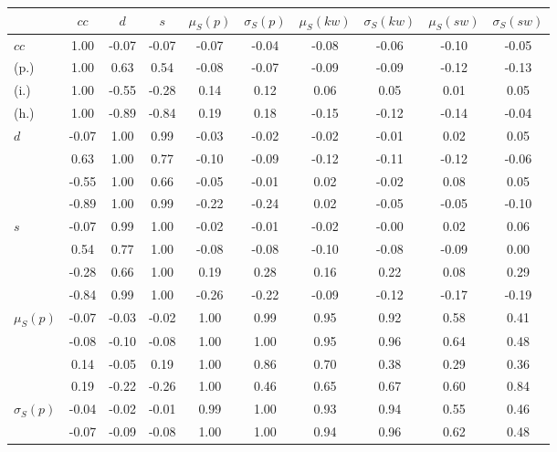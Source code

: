 \begin{table*}[h!]
\begin{center}
\begin{tabular}{| l | c | c | c | c | c | c | c | c | c |}\hline
 & $cc$ & $d$ & $s$ & $\mu_S(p)$ & $\sigma_S(p)$ & $\mu_S(kw)$ & $\sigma_S(kw)$ & $\mu_S(sw)$ & $\sigma_S(sw)$ \\\hline
$cc$ & 1.00  & -0.07  & -0.07  & -0.07  & -0.04  & -0.08  & -0.06  & -0.10  & -0.05 \\\hline
(p.) & 1.00  & 0.63  & 0.54  & -0.08  & -0.07  & -0.09  & -0.09  & -0.12  & -0.13 \\\hline
(i.) & 1.00  & -0.55  & -0.28  & 0.14  & 0.12  & 0.06  & 0.05  & 0.01  & 0.05 \\\hline
(h.) & 1.00  & -0.89  & -0.84  & 0.19  & 0.18  & -0.15  & -0.12  & -0.14  & -0.04 \\\hline
$d$ & -0.07  & 1.00  & 0.99  & -0.03  & -0.02  & -0.02  & -0.01  & 0.02  & 0.05 \\\hline
 & 0.63  & 1.00  & 0.77  & -0.10  & -0.09  & -0.12  & -0.11  & -0.12  & -0.06 \\\hline
 & -0.55  & 1.00  & 0.66  & -0.05  & -0.01  & 0.02  & -0.02  & 0.08  & 0.05 \\\hline
 & -0.89  & 1.00  & 0.99  & -0.22  & -0.24  & 0.02  & -0.05  & -0.05  & -0.10 \\\hline
$s$ & -0.07  & 0.99  & 1.00  & -0.02  & -0.01  & -0.02  & -0.00  & 0.02  & 0.06 \\\hline
 & 0.54  & 0.77  & 1.00  & -0.08  & -0.08  & -0.10  & -0.08  & -0.09  & 0.00 \\\hline
 & -0.28  & 0.66  & 1.00  & 0.19  & 0.28  & 0.16  & 0.22  & 0.08  & 0.29 \\\hline
 & -0.84  & 0.99  & 1.00  & -0.26  & -0.22  & -0.09  & -0.12  & -0.17  & -0.19 \\\hline
$\mu_S(p)$ & -0.07  & -0.03  & -0.02  & 1.00  & 0.99  & 0.95  & 0.92  & 0.58  & 0.41 \\\hline
 & -0.08  & -0.10  & -0.08  & 1.00  & 1.00  & 0.95  & 0.96  & 0.64  & 0.48 \\\hline
 & 0.14  & -0.05  & 0.19  & 1.00  & 0.86  & 0.70  & 0.38  & 0.29  & 0.36 \\\hline
 & 0.19  & -0.22  & -0.26  & 1.00  & 0.46  & 0.65  & 0.67  & 0.60  & 0.84 \\\hline
$\sigma_S(p)$ & -0.04  & -0.02  & -0.01  & 0.99  & 1.00  & 0.93  & 0.94  & 0.55  & 0.46 \\\hline
 & -0.07  & -0.09  & -0.08  & 1.00  & 1.00  & 0.94  & 0.96  & 0.62  & 0.48 \\\hline

\end{tabular}
\end{center}
\end{table*}
